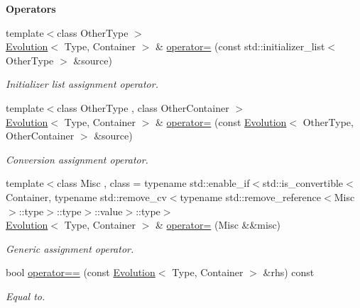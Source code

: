 \begin{Indent}{\bf Operators}\par
\begin{DoxyCompactItemize}
\item 
{\footnotesize template$<$class Other\-Type $>$ }\\\hyperlink{exceptionmagrathea_1_1Evolution}{Evolution}$<$ Type, Container $>$ \& \hyperlink{exceptionmagrathea_1_1Evolution_aa5ac3f60fed1df3a9ba4790e7482ba62}{operator=} (const std\-::initializer\-\_\-list$<$ Other\-Type $>$ \&source)
\begin{DoxyCompactList}\small\item\em Initializer list assignment operator. \end{DoxyCompactList}\item 
{\footnotesize template$<$class Other\-Type , class Other\-Container $>$ }\\\hyperlink{exceptionmagrathea_1_1Evolution}{Evolution}$<$ Type, Container $>$ \& \hyperlink{exceptionmagrathea_1_1Evolution_aaac98f596b9a3d289ed5366e73b45278}{operator=} (const \hyperlink{exceptionmagrathea_1_1Evolution}{Evolution}$<$ Other\-Type, Other\-Container $>$ \&source)
\begin{DoxyCompactList}\small\item\em Conversion assignment operator. \end{DoxyCompactList}\item 
{\footnotesize template$<$class Misc , class  = typename std\-::enable\-\_\-if$<$std\-::is\-\_\-convertible$<$\-Container, typename std\-::remove\-\_\-cv$<$typename std\-::remove\-\_\-reference$<$\-Misc$>$\-::type$>$\-::type$>$\-::value$>$\-::type$>$ }\\\hyperlink{exceptionmagrathea_1_1Evolution}{Evolution}$<$ Type, Container $>$ \& \hyperlink{exceptionmagrathea_1_1Evolution_a6ba4d84bb531c1668725dd5655815b40}{operator=} (Misc \&\&misc)
\begin{DoxyCompactList}\small\item\em Generic assignment operator. \end{DoxyCompactList}\item 
bool \hyperlink{exceptionmagrathea_1_1Evolution_a10b244e64b2df5b2de426bcc1a37b6ce}{operator==} (const \hyperlink{exceptionmagrathea_1_1Evolution}{Evolution}$<$ Type, Container $>$ \&rhs) const 
\begin{DoxyCompactList}\small\item\em Equal to. \end{DoxyCompactList}\item 

\end{DoxyCompactItemize}
\end{Indent}
